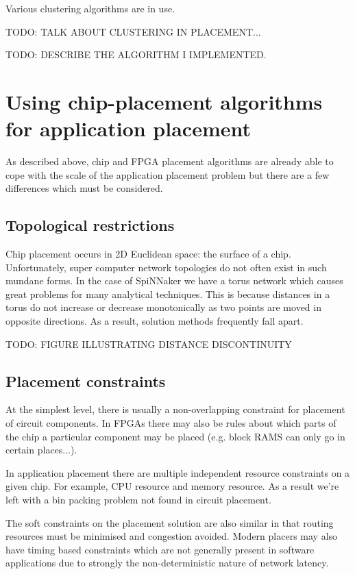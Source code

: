 				Various clustering algorithms are in use.
				
				TODO: TALK ABOUT CLUSTERING IN PLACEMENT...
				
				TODO: DESCRIBE THE ALGORITHM I IMPLEMENTED.
	
	\section{Using chip-placement algorithms for application placement}
		
		As described above, chip and FPGA placement algorithms are already able to
		cope with the scale of the application placement problem but there are a
		few differences which must be considered.
		
		\subsection{Topological restrictions}
			
			Chip placement occurs in 2D Euclidean space: the surface of a chip.
			Unfortunately, super computer network topologies do not often exist in
			such mundane forms. In the case of SpiNNaker we have a torus network
			which causes great problems for many analytical techniques. This is
			because distances in a torus do not increase or decrease monotonically as
			two points are moved in opposite directions. As a result, solution
			methods frequently fall apart.
			
			TODO: FIGURE ILLUSTRATING DISTANCE DISCONTINUITY
		
		\subsection{Placement constraints}
			
			At the simplest level, there is usually a non-overlapping constraint for
			placement of circuit components. In FPGAs there may also be rules about
			which parts of the chip a particular component may be placed (e.g. block
			RAMS can only go in certain places...).
			
			In application placement there are multiple independent resource
			constraints on a given chip. For example, CPU resource and memory
			resource. As a result we're left with a bin packing problem not found in
			circuit placement.
			
			The soft constraints on the placement solution are also similar in that
			routing resources must be minimised and congestion avoided. Modern
			placers may also have timing based constraints which are not generally
			present in software applications due to strongly the non-deterministic
			nature of network latency.
	
